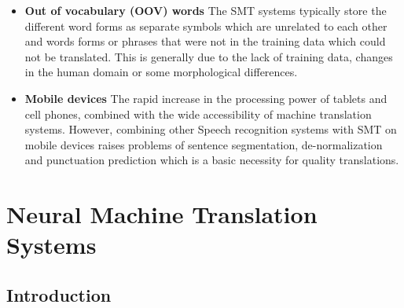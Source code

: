 \begin{itemize}
     \item\textbf{Out of vocabulary (OOV) words}    The SMT systems typically store the different word forms as separate symbols which are unrelated to each other and words forms or phrases that were not in the training data which could not be translated. This is generally due to the lack of training data, changes in the human domain or some morphological differences. 
     \item\textbf{Mobile devices}   The rapid increase in the processing power of tablets and cell phones, combined with the wide accessibility of machine translation systems. However, combining other Speech recognition systems with SMT on mobile devices raises problems of sentence segmentation, de-normalization and punctuation prediction which is a basic necessity for quality translations.
\end{itemize}
\section{Neural Machine Translation Systems}
\subsection{Introduction}
